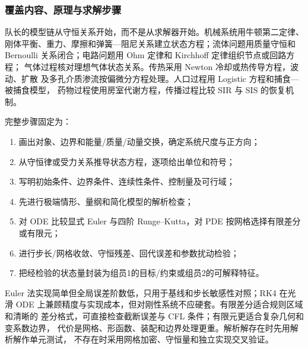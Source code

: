 \subsubsection{覆盖内容、原理与求解步骤}

队长的模型链从守恒关系开始，而不是从求解器开始。机械系统用牛顿第二定律、
刚体平衡、重力、摩擦和弹簧—阻尼关系建立状态方程；流体问题用质量守恒和
Bernoulli 关系闭合；电路问题用 Ohm 定律和 Kirchhoff 定律组织节点或回路方程；
气体过程核对理想气体状态关系。传热采用 Newton 冷却或热传导方程，波动、扩散
及多孔介质渗流按偏微分方程处理。人口过程用 Logistic 方程和捕食—被捕食模型，
药物过程使用房室代谢方程，传播过程比较 SIR 与 SIS 的恢复机制。

完整步骤固定为：
\begin{enumerate}
  \item 画出对象、边界和能量/质量/动量交换，确定系统尺度与正方向；
  \item 从守恒律或受力关系推导状态方程，逐项给出单位和符号；
  \item 写明初始条件、边界条件、连续性条件、控制量及可行域；
  \item 先进行极端情形、量纲和简化模型的解析检查；
  \item 对 ODE 比较显式 Euler 与四阶 Runge--Kutta，对 PDE 按网格选择有限差分或有限元；
  \item 进行步长/网格收敛、守恒残差、回代误差和参数扰动检验；
  \item 把经检验的状态量封装为组员1的目标/约束或组员2的可解释特征。
\end{enumerate}

Euler 法实现简单但全局误差阶数低，只用于基线和步长敏感性对照；RK4 在光滑 ODE
上兼顾精度与实现成本，但对刚性系统不应硬套。有限差分适合规则区域和清晰的
差分格式，可直接检查截断误差与 CFL 条件；有限元更适合复杂几何和变系数边界，
代价是网格、形函数、装配和边界处理更重。解析解存在时先用解析解作单元测试，
不存在时采用网格加密、守恒量和独立实现交叉验证。

